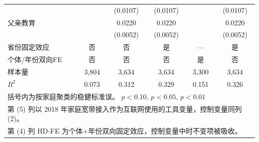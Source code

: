 \begin{table}[htbp]
\begin{tabular}{lccccc}
                &                  & (0.0107)         & (0.0107)         &                  & (0.0107)         \\
父亲教育         &                  &   0.0220\sym{***}&   0.0220\sym{***}&                  &   0.0220\sym{***}\\
                &                  & (0.0052)         & (0.0052)         &                  & (0.0052)         \\
省份固定效应     &       否         &       否         &       是         &       ---        &       是         \\
个体/年份双向FE &       否         &       否         &       否         &       是         &       否         \\
\hline
样本量          &    3,804         &    3,634         &    3,634         &    3,300         &    3,634         \\
$R^2$           &    0.073         &    0.312         &    0.329         &    0.151         &    0.326         \\
\hline\hline
\multicolumn{6}{l}{\footnotesize 括号内为按家庭聚类的稳健标准误。\sym{*} \(p<0.10\), \sym{**} \(p<0.05\), \sym{***} \(p<0.01\)}\\
\multicolumn{6}{l}{\footnotesize 第 (5) 列以 2018 年家庭宽带接入作为互联网使用的工具变量，控制变量同列 (2)。}\\
\multicolumn{6}{l}{\footnotesize 第 (4) 列 HD-FE 为个体+年份双向固定效应，控制变量中时不变项被吸收。}\\
\end{tabular}
\end{table}